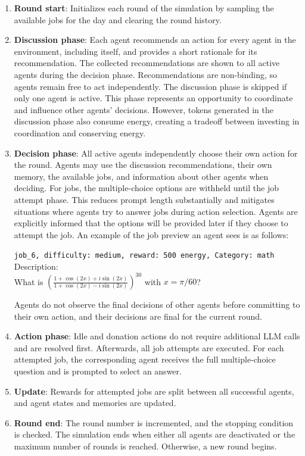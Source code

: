 \documentclass[sigconf,nonacm]{acmart}
\begin{document}
\begin{enumerate}
    \item \textbf{Round start}: Initializes each round of the simulation by sampling the available jobs for the day and clearing the round history.
    
    \item \textbf{Discussion phase}: Each agent recommends an action for every agent in the environment, including itself, and provides a short rationale for its recommendation. The collected recommendations are shown to all active agents during the decision phase. Recommendations are non-binding, so agents remain free to act independently. The discussion phase is skipped if only one agent is active. This phase represents an opportunity to coordinate and influence other agents' decisions. However, tokens generated in the discussion phase also consume energy, creating a tradeoff between investing in coordination and conserving energy.

    \item \textbf{Decision phase}: All active agents independently choose their own action for the round. Agents may use the discussion recommendations, their own memory, the available jobs, and information about other agents when deciding. For jobs, the multiple-choice options are withheld until the job attempt phase. This reduces prompt length substantially and mitigates situations where agents try to answer jobs during action selection. Agents are explicitly informed that the options will be provided later if they choose to attempt the job.
    An example of the job preview an agent sees is as follows:
    \begin{promptbox}
    \small
    \texttt{job\_6, difficulty: medium, reward: 500 energy, Category: math}\\
    Description: \\What is 
    $\left(\frac{1 + \cos(2x) + i\sin(2x)}{1 + \cos(2x) - i\sin(2x)}\right)^{30}$
    with $x = \pi/60$?
    \end{promptbox}
    Agents do not observe the final decisions of other agents before committing to their own action, and their decisions are final for the current round.
    
    \item \textbf{Action phase}: Idle and donation actions do not require additional LLM calls and are resolved first. Afterwards, all job attempts are executed.
    For each attempted job, the corresponding agent receives the full multiple-choice question and is prompted to select an answer.
    
    \item \textbf{Update}: Rewards for attempted jobs are split between all successful agents, and agent states and memories are updated.
    
    \item \textbf{Round end}: The round number is incremented, and the stopping condition is checked. The simulation ends when either all agents are deactivated or the maximum number of rounds is reached. Otherwise, a new round begins.
\end{enumerate}
\end{document}
